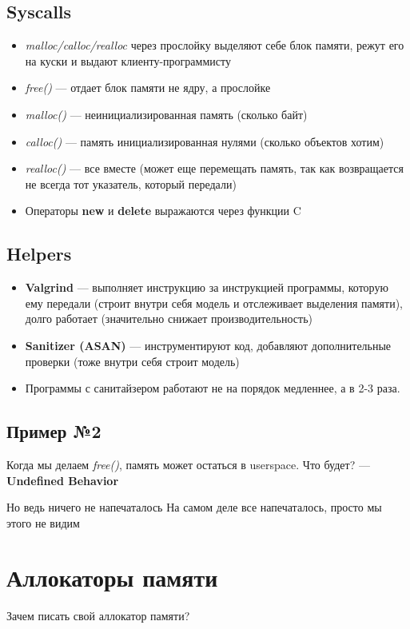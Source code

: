 \documentclass[../../lectures.tex]{subfiles}
\begin{document}
\subsection{Syscalls}
\begin{itemize}
    \item \emph{malloc/calloc/realloc} через прослойку выделяют себе блок памяти, режут его на куски и выдают клиенту-программисту
    \item \emph{free()} --- отдает блок памяти не ядру, а прослойке
    \item \emph{malloc()} --- неинициализированная память (сколько байт)
    \item \emph{calloc()} --- память инициализированная нулями (сколько объектов хотим)
    \item \emph{realloc()} --- все вместе (может еще перемещать память, 
          так как возвращается не всегда тот указатель, который передали)
    \item Операторы \textbf{new} и \textbf{delete} выражаются через функции C
\end{itemize}

\subsection{Helpers}
\begin{itemize}
    \item \textbf{Valgrind} --- выполняет инструкцию за инструкцией программы, которую ему передали 
          (строит внутри себя модель и отслеживает выделения памяти), долго работает 
          (значительно снижает производительность)
    \item \textbf{Sanitizer (ASAN)} --- инструментируют код, добавляют дополнительные проверки (тоже внутри себя строит модель)
    \item Программы с санитайзером работают не на порядок медленнее, а в 2-3 раза.
\end{itemize}

\subsection{Пример №2}
Когда мы делаем \emph{free()}, память может остаться в userspace.
Что будет? --- \textbf{Undefined Behavior}

Но ведь ничего не напечаталось
На самом деле все напечаталось, просто мы этого не видим

\newpage
\section{Аллокаторы памяти}
Зачем писать свой аллокатор памяти?
\end{document}
